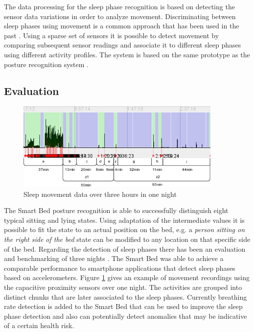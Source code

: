 The data processing for the sleep phase recognition is based on detecting the sensor data variations in order to analyze movement. Discriminating between sleep phases using movement is a common approach that has been used in the past \cite{salmi86}. Using a sparse set of sensors it is possible to detect movement by comparing subsequent sensor readings and associate it to different sleep phases using different activity profiles. The system is based on the same prototype as the posture recognition system \cite{Djakow2013movibed}. 
\subsection{Evaluation}
\begin{figure}[h]
\centering
\includegraphics[width=0.9\textwidth]{images/smartbed_sleepphase}
\caption{Sleep movement data over three hours in one night \cite{Djakow2013movibed}}
\label{fig:smartbed_sleepphase}
\end{figure}
The Smart Bed posture recognition is able to successfully distinguish eight typical sitting and lying states. Using adaptation of the intermediate values it is possible to fit the state to an actual position on the bed, e.g. a \emph{person sitting on the right side of the bed} state can be modified to any location on that specific side of the bed. 
Regarding the detection of sleep phases there has been an evaluation and benchmarking of three nights \cite{Djakow2013movibed}. The Smart Bed was able to achieve a comparable performance to smartphone applications that detect sleep phases based on accelerometers. Figure \ref{fig:smartbed_sleepphase} gives an example of movement recordings using the capacitive proximity sensors over one night. The activities are grouped into distinct chunks that are later associated to the sleep phases. Currently breathing rate detection is added to the Smart Bed that can be used to improve the sleep phase detection and also can potentially detect anomalies that may be indicative of a certain health risk.
